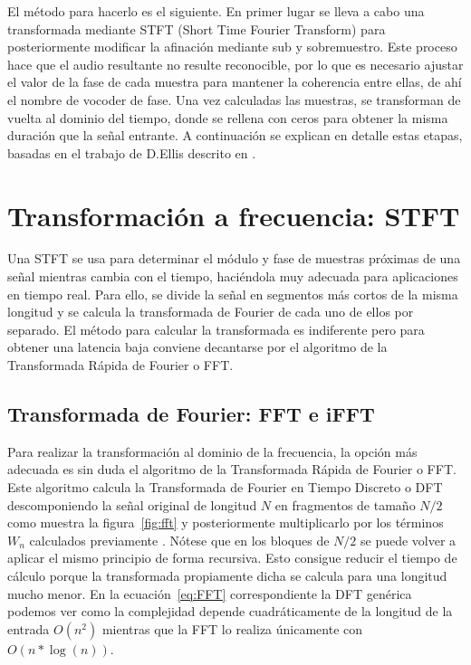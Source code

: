 El método para hacerlo es el siguiente. En primer lugar se lleva a cabo una transformada mediante STFT (Short Time Fourier Transform) para posteriormente modificar la afinación mediante sub y sobremuestro. Este proceso hace que el audio resultante no resulte reconocible, por lo que es necesario ajustar el valor de la fase de cada muestra para mantener la coherencia entre ellas, de ahí el nombre de vocoder de fase. Una vez calculadas las muestras, se transforman de vuelta al dominio del tiempo, donde se rellena con ceros para obtener la misma duración que la señal entrante. A continuación se explican en detalle estas etapas, basadas en el trabajo de D.Ellis descrito en \cite{Ellis}.

\section{Transformación a frecuencia: STFT}

Una STFT se usa para determinar el módulo y fase de muestras próximas de una señal mientras cambia con el tiempo, haciéndola muy adecuada para aplicaciones en tiempo real. Para ello, se divide la señal en segmentos más cortos de la misma longitud y se calcula la transformada de Fourier de cada uno de ellos por separado. El método para calcular la transformada es indiferente pero para obtener una latencia baja conviene decantarse por el algoritmo de la Transformada Rápida de Fourier o FFT.

\subsection{Transformada de Fourier: FFT e iFFT}

Para realizar la transformación al dominio de la frecuencia, la opción más adecuada es sin duda el algoritmo de la Transformada Rápida de Fourier o FFT. Este algoritmo calcula la Transformada de Fourier en Tiempo Discreto o DFT descomponiendo la señal original de longitud $N$ en fragmentos de tamaño $N/2$ como muestra la figura~\ref{fig:fft} y posteriormente multiplicarlo por los términos $W_{n}$ calculados previamente \cite{Oppenheim}. Nótese que en los bloques de $N/2$ se puede volver a aplicar el mismo principio de forma recursiva. Esto consigue reducir el tiempo de cálculo porque la transformada propiamente dicha se calcula para una longitud mucho menor. En la ecuación~\ref{eq:FFT} correspondiente la DFT genérica podemos ver como la complejidad depende cuadráticamente de la longitud de la entrada $O({n^{2}})$ mientras que la FFT lo realiza únicamente con $O({n*\log (n)})$.


